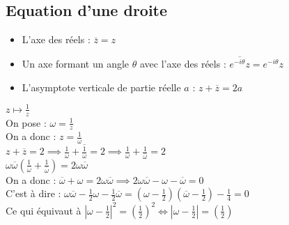 \subsection{Equation d'une droite}
\begin{itemize}
    \item L'axe des réels : $\overline{z} = z$
    \item Un axe formant un angle $\theta$ avec l'axe des réels : $\overline{e^{-i\theta}z}= e^{-i\theta}z$
    \item L'asymptote verticale de partie réelle $a$ : $z + \overline{z} = 2a$
\end{itemize}


\begin{exemple}
    $z \mapsto \frac{1}{z}$ 
    \\
    On pose : $\omega = \frac{1}{z}$
    \\
    On a donc : $z = \frac{1}{\omega}$
    \\
    $z + \overline{z} = 2 \implies \frac{1}{\omega} + \overline{\frac{1}{\omega}} = 2 \implies \frac{1}{\omega} + \frac{1}{\overline{\omega}} = 2$ \\
    $\omega\overline{\omega} \left( \frac{1}{\omega} + \frac{1}{\overline{\omega}} \right) = 2\omega\overline{\omega}$
    \\
    On a donc : $\overline{\omega} + \omega = 2\omega\overline{\omega} \implies 2\omega\overline{\omega} - \omega - \overline{\omega} = 0$ 
    \\
    C'est à dire : $\omega\overline{\omega} - \frac{1}{2}\omega - \frac{1}{2}\overline{\omega} = \left( \omega - \frac{1}{2} \right) \left( \overline{\omega} - \frac{1}{2} \right) - \frac{1}{4} = 0$
    \\
    Ce qui équivaut à $\left| \omega - \frac{1}{2} \right|^2 = \left( \frac{1}{2} \right)^2 \iff \left|\omega - \frac{1}{2}\right| = \left(\frac{1}{2}\right)$
\end{exemple}



